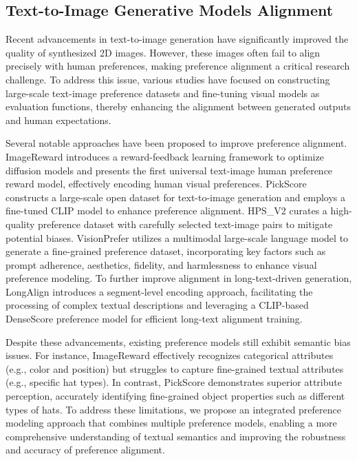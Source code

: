 \subsection{Text-to-Image Generative Models Alignment}\label{2.3}
Recent advancements in text-to-image generation have significantly improved the quality of synthesized 2D images. However, these images often fail to align precisely with human preferences, making preference alignment a critical research challenge. To address this issue, various studies \cite{imagereward,pickscore,visionprefer,longalign} have focused on constructing large-scale text-image preference datasets and fine-tuning visual models as evaluation functions, thereby enhancing the alignment between generated outputs and human expectations.

Several notable approaches have been proposed to improve preference alignment. ImageReward \cite{imagereward} introduces a reward-feedback learning framework to optimize diffusion models and presents the first universal text-image human preference reward model, effectively encoding human visual preferences. PickScore \cite{pickscore} constructs a large-scale open dataset for text-to-image generation and employs a fine-tuned CLIP model to enhance preference alignment. HPS\_V2 \cite{hps} curates a high-quality preference dataset with carefully selected text-image pairs to mitigate potential biases. VisionPrefer \cite{visionprefer} utilizes a multimodal large-scale language model to generate a fine-grained preference dataset, incorporating key factors such as prompt adherence, aesthetics, fidelity, and harmlessness to enhance visual preference modeling. To further improve alignment in long-text-driven generation, LongAlign \cite{longalign} introduces a segment-level encoding approach, facilitating the processing of complex textual descriptions and leveraging a CLIP-based DenseScore preference model for efficient long-text alignment training.

Despite these advancements, existing preference models still exhibit semantic bias issues. For instance, ImageReward effectively recognizes categorical attributes (e.g., color and position) but struggles to capture fine-grained textual attributes (e.g., specific hat types). In contrast, PickScore demonstrates superior attribute perception, accurately identifying fine-grained object properties such as different types of hats. To address these limitations, we propose an integrated preference modeling approach that combines multiple preference models, enabling a more comprehensive understanding of textual semantics and improving the robustness and accuracy of preference alignment.